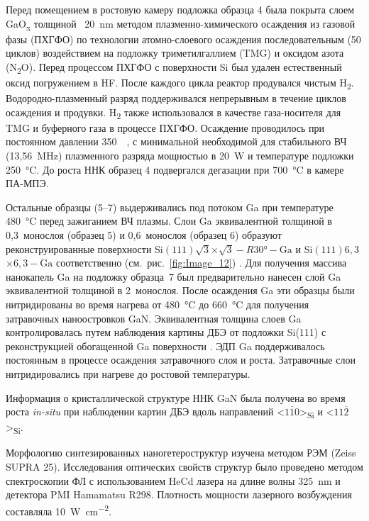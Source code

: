 Перед помещением в ростовую камеру подложка образца 4 была покрыта слоем GaO\textsubscript{x} толщиной ~20~\si{\nano\meter} методом плазменно-химического осаждения из газовой фазы (ПХГФО) по технологии атомно-слоевого осаждения \cite{Altuntas2014, Ramachandran2014} последовательным (50 циклов) воздействием на подложку триметилгаллием (TMG) и оксидом азота (N\textsubscript{2}O). Перед процессом ПХГФО с поверхности Si был удален естественный оксид погружением в HF. После каждого цикла реактор продувался чистым H\textsubscript{2}. Водородно-плазменный разряд поддерживался непрерывным в течение циклов осаждения и продувки. H\textsubscript{2} также использовался в качестве газа-носителя для TMG и буферного газа в процессе ПХГФО. Осаждение проводилось при постоянном давлении 350~\si{\milli\torr}, с минимальной необходимой для стабильного ВЧ (13,56~\si{\mega\hertz}) плазменного разряда мощностью в 20~\si{\watt} и температуре подложки 250~\si{\degreeCelsius}. До роста ННК образец 4 подвергался дегазации при 700~\si{\degreeCelsius} в камере ПА-МПЭ.

Остальные образцы (5--7) выдерживались под потоком Ga при температуре 480~\si{\degreeCelsius} перед зажиганием ВЧ плазмы. Слои Ga эквивалентной толщиной в 0,3~монослоя (образец 5) и 0,6~монослоя (образец 6) образуют реконструированные поверхности  Si\((111)\sqrt{3}\)\(\times\)\(\sqrt{3} - R30\si{\degree} - \text{Ga}\) и Si\((111)6,3\)\(\times\)\(6,3 - \text{Ga}\) соответственно (см.~рис.~\cref{fig:Image_12}) \cite{Park1988}. Для получения массива нанокапель Ga на подложку образца~7 был предварительно нанесен слой Ga эквивалентной толщиной в 2~монослоя. После осаждения Ga эти образцы были нитридированы во время нагрева от 480~\si{\degreeCelsius} до 660~\si{\degreeCelsius} для получения затравочных наноостровков GaN. Эквивалентная толщина слоев Ga контролировалась путем наблюдения картины ДБЭ от подложки Si(111) с реконструкцией обогащенной Ga поверхности \cite{Fedorov2018}. ЭДП Ga поддерживалось постоянным в процессе осаждения затравочного слоя и роста. Затравочные слои нитридировались при нагреве до ростовой температуры.

Информация о кристаллической структуре ННК GaN была получена во время роста \textit{in-situ} при наблюдении картин ДБЭ вдоль направлений <\(1\overline{1}0\)>\textsubscript{Si} и <\(11\overline{2}\)>\textsubscript{Si}.

Морфологию синтезированных наногетероструктур изучена методом РЭМ (Zeiss SUPRA 25). Исследования оптических свойств структур было проведено методом спектроскопии ФЛ с использованием HeCd лазера на длине волны 325~\si{\nano\meter} и детектора PMI Hamamatsu R298. Плотность мощности лазерного возбуждения составляла 10~\si{\watt\per\centi\meter\squared}.

